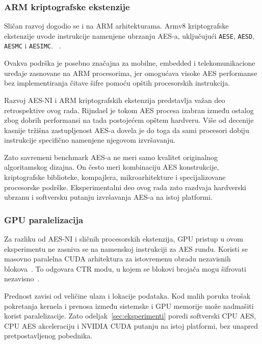 \subsubsection{ARM kriptografske ekstenzije}

Sličan razvoj dogodio se i na ARM arhitekturama. Armv8 kriptografske
ekstenzije uvode instrukcije namenjene ubrzanju AES-a, uključujući
\texttt{AESE}, \texttt{AESD}, \texttt{AESMC} i \texttt{AESIMC}.
~\cite{armv8-crypto}.

Ovakva podrška je posebno značajna za mobilne, embedded i
telekomunikacione uređaje zasnovane na ARM procesorima, jer omogućava
visoke AES performanse bez implementiranja čitave šifre pomoću opštih
procesorskih instrukcija.

Razvoj AES-NI i ARM kriptografskih ekstenzija predstavlja važan deo
retrospektive ovog rada. Rijndael je tokom AES procesa izabran između
ostalog zbog dobrih performansi na tada postojećem opštem hardveru.
Više od decenije kasnije tržišna zastupljenost AES-a dovela je do toga
da sami procesori dobiju instrukcije specifično namenjene njegovom
izvršavanju.

Zato savremeni benchmark AES-a ne meri samo kvalitet originalnog
algoritamskog dizajna. On često meri kombinaciju AES konstrukcije,
kriptografske biblioteke, kompajlera, mikroarhitekture i specijalizovane
procesorske podrške. Eksperimentalni deo ovog rada zato
razdvaja hardverski ubrzanu i softversku putanju izvršavanja
AES-a na istoj platformi.

\subsubsection{GPU paralelizacija}

Za razliku od AES-NI i sličnih procesorskih ekstenzija, GPU pristup
u ovom eksperimentu ne zasniva se na namenskoj instrukciji za AES rundu.
Koristi se masovno paralelna CUDA arhitektura za istovremenu obradu
nezavisnih blokova~\cite{nvidia-cuda-model}. To odgovara CTR modu,
u kojem se blokovi brojača mogu šifrovati nezavisno~\cite{sp800-38a}.

Prednost zavisi od veličine ulaza i lokacije podataka. Kod malih poruka
trošak pokretanja kernela i prenosa između sistemske i GPU memorije može
nadmašiti korist paralelizacije. Zato odeljak~\ref{sec:eksperimenti}
poredi softverski CPU AES, CPU AES akceleraciju i NVIDIA CUDA putanju
na istoj platformi, bez unapred pretpostavljenog pobednika.
